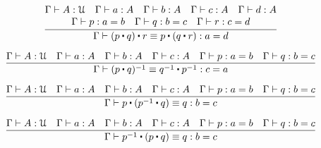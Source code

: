\documentclass[a4paper,UKenglish,cleveref, autoref, thm-restate]{lipics-v2021}
\newcommand{\UU}{\ensuremath{\mathcal{U}}}
\newcommand{\ct}{%
  \mathchoice{\mathbin{\raisebox{0.5ex}{$\displaystyle\centerdot$}}}%
             {\mathbin{\raisebox{0.5ex}{$\centerdot$}}}%
             {\mathbin{\raisebox{0.25ex}{$\scriptstyle\,\centerdot\,$}}}%
             {\mathbin{\raisebox{0.1ex}{$\scriptscriptstyle\,\centerdot\,$}}}
}
\begin{document}
\begin{equation*}
    \frac{\begin{matrix}
            \Gamma \vdash A : \UU \hspace{10pt} \Gamma \vdash a : A \hspace{10pt} \Gamma \vdash b : A \hspace{10pt} \Gamma \vdash c : A \hspace{10pt} \Gamma \vdash d : A \\
            \Gamma \vdash p : a = b \hspace{10pt} \Gamma \vdash q : b = c \hspace{10pt} \Gamma \vdash r : c = d
          \end{matrix}}
         {\Gamma \vdash (p \ct q) \ct r \equiv p \ct (q \ct r) : a = d}
\end{equation*}

\begin{equation*}
    \frac{\Gamma \vdash A : \UU \hspace{10pt} \Gamma \vdash a : A \hspace{10pt} \Gamma \vdash b : A \hspace{10pt} \Gamma \vdash c : A \hspace{10pt} \Gamma \vdash p : a = b \hspace{10pt} \Gamma \vdash q : b = c}
         {\Gamma \vdash (p \ct q)^{-1} \equiv q^{-1} \ct p^{-1} : c = a}
\end{equation*}

\begin{equation*}
    \frac{\Gamma \vdash A : \UU \hspace{10pt} \Gamma \vdash a : A \hspace{10pt} \Gamma \vdash b : A \hspace{10pt} \Gamma \vdash c : A \hspace{10pt} \Gamma \vdash p : a = b \hspace{10pt} \Gamma \vdash q : b = c}
         {\Gamma \vdash p \ct (p^{-1} \ct q) \equiv q : b = c}
\end{equation*}

\begin{equation*}
    \frac{\Gamma \vdash A : \UU \hspace{10pt} \Gamma \vdash a : A \hspace{10pt} \Gamma \vdash b : A \hspace{10pt} \Gamma \vdash c : A \hspace{10pt} \Gamma \vdash p : a = b \hspace{10pt} \Gamma \vdash q : b = c}
         {\Gamma \vdash p^{-1} \ct (p \ct q) \equiv q : b = c}
\end{equation*}
\end{document}
